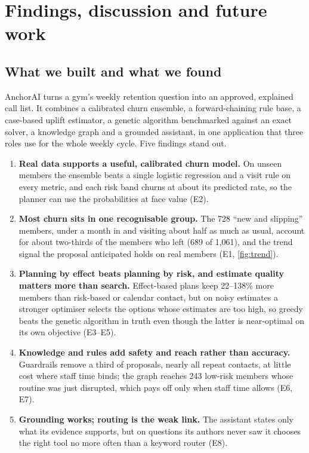 \chapter{Findings, discussion and future work}
\label{ch:conclusions}

\section{What we built and what we found}

AnchorAI turns a gym's weekly retention question into an approved, explained call list. It combines a calibrated churn ensemble, a forward-chaining rule base, a case-based uplift estimator, a genetic algorithm benchmarked against an exact solver, a knowledge graph and a grounded assistant, in one application that three roles use for the whole weekly cycle. Five findings stand out.

\begin{enumerate}
  \item \textbf{Real data supports a useful, calibrated churn model.} On unseen members the ensemble beats a single logistic regression and a visit rule on every metric, and each risk band churns at about its predicted rate, so the planner can use the probabilities at face value (E2).
  \item \textbf{Most churn sits in one recognisable group.} The 728 \enquote{new and slipping} members, under a month in and visiting about half as much as usual, account for about two-thirds of the members who left (689 of 1,061), and the trend signal the proposal anticipated holds on real members (E1, \cref{fig:trend}).
  \item \textbf{Planning by effect beats planning by risk, and estimate quality matters more than search.} Effect-based plans keep 22--138\% more members than risk-based or calendar contact, but on noisy estimates a stronger optimiser selects the options whose estimates are too high, so greedy beats the genetic algorithm in truth even though the latter is near-optimal on its own objective (E3--E5).
  \item \textbf{Knowledge and rules add safety and reach rather than accuracy.} Guardrails remove a third of proposals, nearly all repeat contacts, at little cost where staff time binds; the graph reaches 243 low-risk members whose routine was just disrupted, which pays off only when staff time allows (E6, E7).
  \item \textbf{Grounding works; routing is the weak link.} The assistant states only what its evidence supports, but on questions its authors never saw it chooses the right tool no more often than a keyword router (E8).
\end{enumerate}

